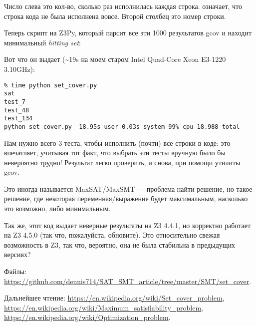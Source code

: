 Число слева это кол-во, сколько раз исполнилась каждая строка.
\TT{\#\#\#\#\#} означает, что строка кода не была исполнена вовсе.
Второй столбец это номер строки.

Теперь скрипт на Z3Py, который парсит все эти 1000 результатов gcov и находит минимальный \textit{hitting set}:



Вот что он выдает (\textasciitilde{}19s на моем старом Intel Quad-Core Xeon E3-1220 3.10GHz):

\begin{lstlisting}
% time python set_cover.py
sat
test_7
test_48
test_134
python set_cover.py  18.95s user 0.03s system 99% cpu 18.988 total
\end{lstlisting}

Нам нужно всего 3 теста, чтобы исполнить (почти) все строки в коде:
это впечатляет, учитывая тот факт, что выбрать эти тесты вручную было бы невероятно трудно!
Результат легко проверить, и снова, при помощи утилиты gcov.

Это иногда называется MaxSAT/MaxSMT --- проблема найти решение, но такое решение,
где некоторая переменная/выражение будет максимальным, насколько это возможно, либо минимальным.

Так же, этот код выдает неверные результаты на Z3 4.4.1, но корректно работает на Z3 4.5.0 (так что, пожалуйста,
обновите).
Это относительно свежая возможность в Z3, так что, вероятно, она не была стабильна в предыдущих версиях?

Файлы: \url{https://github.com/dennis714/SAT_SMT_article/tree/master/SMT/set_cover}.

Дальнейшее чтение:
\url{https://en.wikipedia.org/wiki/Set_cover_problem},
\url{https://en.wikipedia.org/wiki/Maximum_satisfiability_problem},
\url{https://en.wikipedia.org/wiki/Optimization_problem}.

